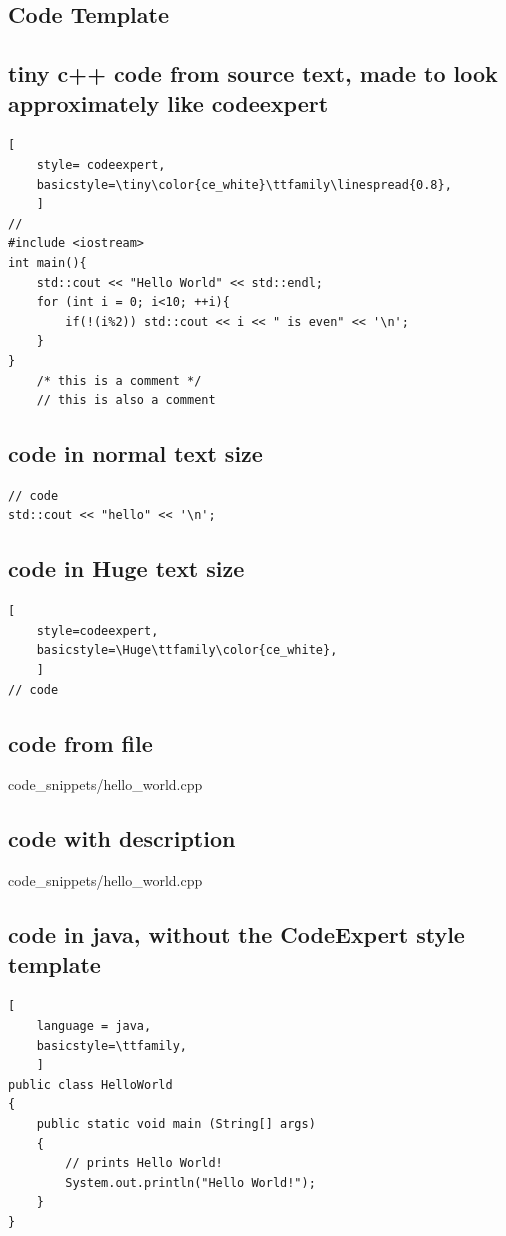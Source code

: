 \documentclass[a4paper,10pt,landscape]{scrartcl}
\begin{document}
\begin{multicols*}{3}
\section{Code Template }
\subsection{tiny c++ code from source text, made to look approximately like codeexpert}
\begin{lstlisting}[
    style= codeexpert,
    basicstyle=\tiny\color{ce_white}\ttfamily\linespread{0.8},
    ]
//
#include <iostream>
int main(){
    std::cout << "Hello World" << std::endl;
    for (int i = 0; i<10; ++i){
        if(!(i%2)) std::cout << i << " is even" << '\n';
    }
}
    /* this is a comment */
    // this is also a comment
\end{lstlisting}
%
\subsection{code in normal text size}
\begin{lstlisting}[style = codeexpert]
// code
std::cout << "hello" << '\n';
\end{lstlisting}
%
\subsection{code in Huge text size} 
\begin{lstlisting}[
    style=codeexpert,
    basicstyle=\Huge\ttfamily\color{ce_white},
    ]
// code
\end{lstlisting}
%
\subsection{code from file}

        {code_snippets/hello_world.cpp}
%
\subsection{code with description}

        {code_snippets/hello_world.cpp}
\subsection{code in java, without the CodeExpert style template}
\begin{lstlisting}[
    language = java,
    basicstyle=\ttfamily,
    ]
public class HelloWorld 
{
    public static void main (String[] args)
    {
        // prints Hello World!
        System.out.println("Hello World!");
    }    
}
\end{lstlisting}
%  
\end{multicols*}
%
\end{document}

